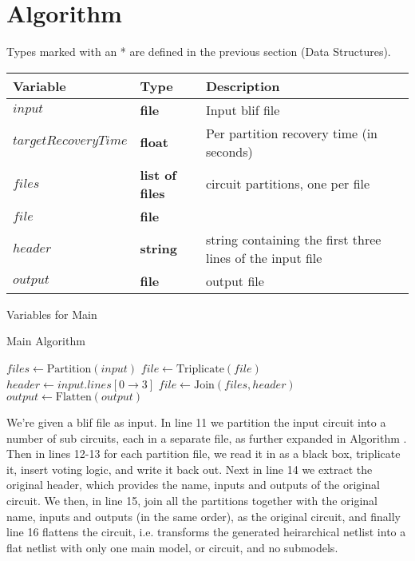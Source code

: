 \documentclass[12pt,final,oneside]{article} %
\begin{document}
\section{Algorithm}
Types marked with an * are defined in the previous section (Data Structures).
\begin{algorithm}
    \begin{center}
        \begin{tabular}{lll}
        \toprule
        Variable & Type & Description\\
        \midrule
        $input$ & \bf{file} & Input blif file\\
        $targetRecoveryTime$ & \bf{float} & Per partition recovery time (in seconds) \\
        $files$ & \bf{list} of \bf{file}s & circuit partitions, one per file \\
        $file$ & \bf{file} & \\
        $header$ & \bf{string} & string containing the first three lines of the input file \\
        $output$ & \bf{file} & output file\\
        \bottomrule
        \end{tabular}
        \caption{Variables for Main}
        \label{varMain}
    \end{center}
   \caption{Main Algorithm}\label{main}
   \begin{algorithmic}[1]
         \State $files \gets \mbox{Partition}(input)$
            \State $file \gets \mbox{Triplicate}(file)$
         \EndFor
         \State $header \gets input.lines[0\to 3]$
         \State $file \gets \mbox{Join}(files, header)$
         \State $output \gets \mbox{Flatten}(output)$
      \EndProcedure
   \end{algorithmic}
\end{algorithm}
We're given a blif file as input.
In line 11 we partition the input circuit into a number of sub circuits, each in a separate file, as further expanded in Algorithm \cite{partitioner}.
Then in lines 12-13 for each partition file, we read it in as a black box, triplicate it, insert voting logic, and write it back out.
Next in line 14 we extract the original header, which provides the name, inputs and outputs of the original circuit.
We then, in line 15, join all the partitions together with the original name, inputs and outputs (in the same order), as the original circuit, and finally line 16 flattens the circuit, i.e. transforms the generated heirarchical netlist into a flat netlist with only one main model, or circuit, and no submodels.
\newpage
\end{document}
